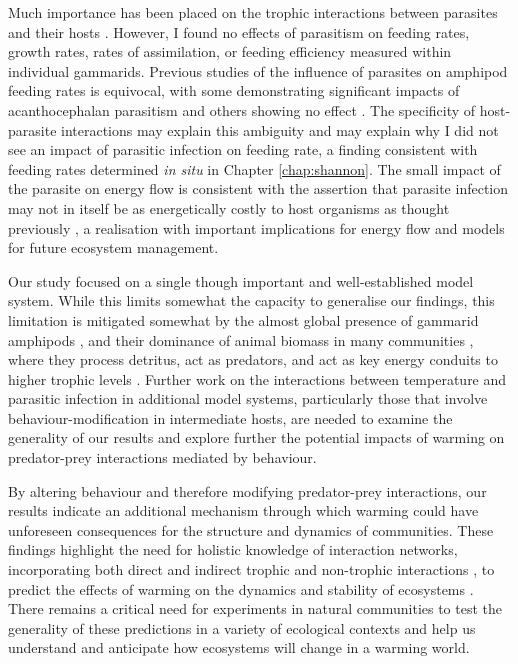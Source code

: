 Much importance has been placed on the trophic interactions between parasites and their hosts \citep{vanveen2008, chen2011, benesh2014}. However, I found no effects of parasitism on feeding rates, growth rates, rates of assimilation, or feeding efficiency measured within individual gammarids. Previous studies of the influence of parasites on amphipod feeding rates is equivocal, with some demonstrating significant impacts of acanthocephalan parasitism \citep{labaude2016, laverty2017} and others showing no effect \citep{fielding2003}. The specificity of host-parasite interactions may explain this ambiguity and may explain why I did not see an impact of parasitic infection on feeding rate, a finding consistent with feeding rates determined \emph{in situ} in Chapter \ref{chap:shannon}. The small impact of the parasite on energy flow is consistent with the assertion that parasite infection may not in itself be as energetically costly to host organisms as thought previously \citep{labaude2015influence}, a realisation with important implications for energy flow and models for future ecosystem management.

Our study focused on a single \textemdash though important and well-established \textemdash model system. While this limits somewhat the capacity to generalise our findings, this limitation is mitigated somewhat by the almost global presence of gammarid amphipods \citep{karaman1977, westram2011}, and their dominance of animal biomass in many communities \citep{mortensen1982}, where they process detritus, act as predators, and act as key energy conduits to higher trophic levels \citep{macneil1997, little2018}. Further work on the interactions between temperature and parasitic infection in additional model systems, particularly those that involve behaviour-modification in intermediate hosts, are needed to examine the generality of our results and explore further the potential impacts of warming on predator-prey interactions mediated by behaviour. 

By altering behaviour and therefore modifying predator-prey interactions, our results indicate an additional mechanism through which warming could have unforeseen consequences for the structure and dynamics of communities.  These findings highlight the need for holistic knowledge of interaction networks, incorporating both direct and indirect trophic and non-trophic interactions \citep{kefi2016}, to predict the effects of warming on the dynamics and stability of ecosystems \citep{kordas2017}. There remains a critical need for experiments in natural communities to test the generality of these predictions in a variety of ecological contexts and help us understand and anticipate how ecosystems will change in a warming world.

